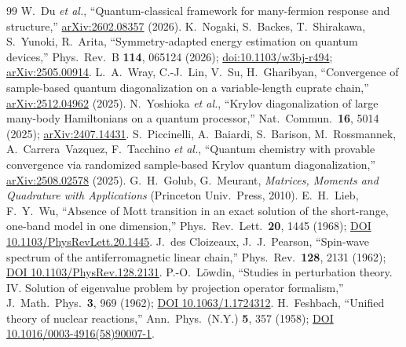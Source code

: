 \begin{thebibliography}{99}
 W.~Du \emph{et al.}, ``Quantum-classical framework for many-fermion response and structure,'' \href{https://arxiv.org/abs/2602.08357}{arXiv:2602.08357} (2026).
 K.~Nogaki, S.~Backes, T.~Shirakawa, S.~Yunoki, R.~Arita, ``Symmetry-adapted energy estimation on quantum devices,'' Phys.\ Rev.\ B \textbf{114}, 065124 (2026); \href{https://doi.org/10.1103/w3bj-r494}{doi:10.1103/w3bj-r494}; \href{https://arxiv.org/abs/2505.00914}{arXiv:2505.00914}.
 L.~A.~Wray, C.-J.~Lin, V.~Su, H.~Gharibyan, ``Convergence of sample-based quantum diagonalization on a variable-length cuprate chain,'' \href{https://arxiv.org/abs/2512.04962}{arXiv:2512.04962} (2025).
 N.~Yoshioka \emph{et al.}, ``Krylov diagonalization of large many-body Hamiltonians on a quantum processor,'' Nat.\ Commun.\ \textbf{16}, 5014 (2025); \href{https://arxiv.org/abs/2407.14431}{arXiv:2407.14431}.
 S.~Piccinelli, A.~Baiardi, S.~Barison, M.~Rossmannek, A.~Carrera~Vazquez, F.~Tacchino \emph{et al.}, ``Quantum chemistry with provable convergence via randomized sample-based Krylov quantum diagonalization,'' \href{https://arxiv.org/abs/2508.02578}{arXiv:2508.02578} (2025).
 G.~H.~Golub, G.~Meurant, \emph{Matrices, Moments and Quadrature with Applications} (Princeton Univ.\ Press, 2010).
 E.~H.~Lieb, F.~Y.~Wu, ``Absence of Mott transition in an exact solution of the short-range, one-band model in one dimension,'' Phys.\ Rev.\ Lett.\ \textbf{20}, 1445 (1968); \href{https://doi.org/10.1103/PhysRevLett.20.1445}{DOI 10.1103/PhysRevLett.20.1445}.
 J.~des Cloizeaux, J.~J.~Pearson, ``Spin-wave spectrum of the antiferromagnetic linear chain,'' Phys.\ Rev.\ \textbf{128}, 2131 (1962); \href{https://doi.org/10.1103/PhysRev.128.2131}{DOI 10.1103/PhysRev.128.2131}.
 P.-O.~L\"owdin, ``Studies in perturbation theory. IV. Solution of eigenvalue problem by projection operator formalism,'' J.\ Math.\ Phys.\ \textbf{3}, 969 (1962); \href{https://doi.org/10.1063/1.1724312}{DOI 10.1063/1.1724312}.
 H.~Feshbach, ``Unified theory of nuclear reactions,'' Ann.\ Phys.\ (N.Y.) \textbf{5}, 357 (1958); \href{https://doi.org/10.1016/0003-4916(58)90007-1}{DOI 10.1016/0003-4916(58)90007-1}.

\end{thebibliography}
